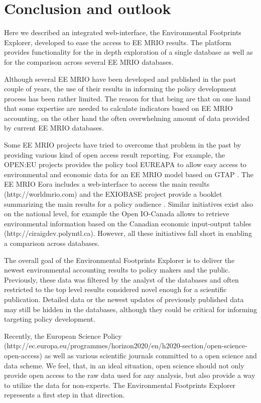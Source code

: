 \section{Conclusion and outlook}

Here we described an integrated web-interface, the Environmental Footprints Explorer, developed to ease the access to EE MRIO results. The platform provides functionality for the in depth exploration of a single database as well as for the comparison across several EE MRIO databases.

Although several EE MRIO have been developed and published in the past couple of years, the use of their results in informing the policy development process has been rather limited. The reason for that being are that on one hand that some expertise are needed to calculate indicators based on EE MRIO accounting, on the other hand the often overwhelming amount of data provided by current EE MRIO databases.

Some EE MRIO projects have tried to overcome that problem in the past by providing various kind of open access result reporting. For example, the OPEN:EU projects provides the policy tool EUREAPA to allow easy access to environmental and economic data for an EE MRIO model based on GTAP \cite{Roelich_2014}. The EE MRIO Eora \cite{Lenzen_2013} includes a web-interface to access the main results (http://worldmrio.com) and the EXIOBASE project provide a booklet summarizing the main results for a policy audience \cite{tukker_global_2014}. Similar initiatives exist also on the national level, for example the Open IO-Canada allows to retrieve environmental information based on the Canadian economic input-output tables (http://ciraigdev.polymtl.ca). However, all these initiatives fall short in enabling a comparison across databases.  

The overall goal of the Environmental Footprints Explorer is to deliver the newest environmental accounting results to policy makers and the public. Previously, these data was filtered by the analyst of the databases and often restricted to the top level results considered novel enough for a scientific publication. Detailed data or the newest updates of previously published data may still be hidden in the databases, although they could be critical for informing targeting policy development.

Recently, the European Science Policy (http://ec.europa.eu/programmes/horizon2020/en/h2020-section/open-science-open-access) as well as various scientific journals \cite{Hanson_2011, Stodden_2012, Boulton_2012} committed to a open science and data scheme. We feel, that, in an ideal situation, open science should not only provide open access to the raw data used for any analysis, but also provide a way to utilize the data for non-experts. The Environmental Footprints Explorer represents a first step in that direction.
    
    